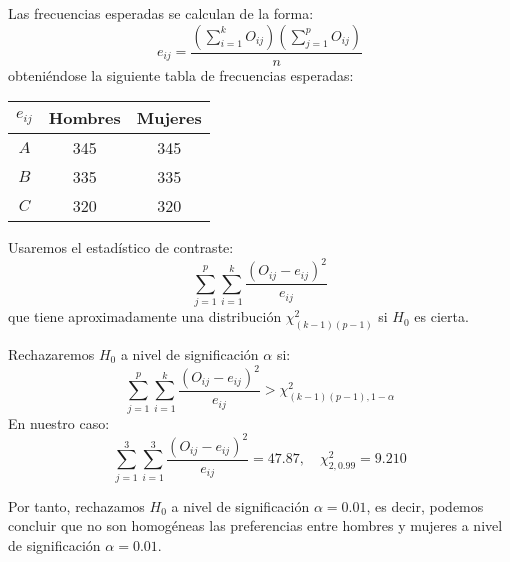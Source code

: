 \begin{example}
    Las frecuencias esperadas se calculan de la forma:
    $$e_{ij} = \frac{(\sum_{i=1}^k O_{ij})(\sum_{j=1}^p O_{ij})}{n}$$
    obteniéndose la siguiente tabla de frecuencias esperadas:
    \begin{center}
        \begin{tabular}{| c | c c |}
            \hline
            $e_{ij}$ & Hombres & Mujeres \\
            \hline
            $A$      & 345     & 345     \\
            $B$      & 335     & 335     \\
            $C$      & 320     & 320     \\
            \hline
        \end{tabular}
    \end{center}

    Usaremos el estadístico de contraste:
    $$\sum_{j=1}^p \sum_{i=1}^k \frac{(O_{ij}-e_{ij})^2}{e_{ij}}$$
    que tiene aproximadamente una distribución $\chi^2_{(k-1)(p-1)}$ si $H_0$ es cierta.

    Rechazaremos $H_0$ a nivel de significación $\alpha$ si:
    $$\sum_{j=1}^p \sum_{i=1}^k \frac{(O_{ij}-e_{ij})^2}{e_{ij}} > \chi^2_{(k-1)(p-1), 1-\alpha}$$
    En nuestro caso:
    $$\sum_{j=1}^3 \sum_{i=1}^3 \frac{(O_{ij}-e_{ij})^2}{e_{ij}} = 47.87, \quad \chi^2_{2, 0.99} = 9.210$$

    Por tanto, rechazamos $H_0$ a nivel de significación $\alpha = 0.01$, es decir, podemos concluir que no son homogéneas las preferencias entre hombres y mujeres a nivel de significación $\alpha = 0.01$.
\end{example}


